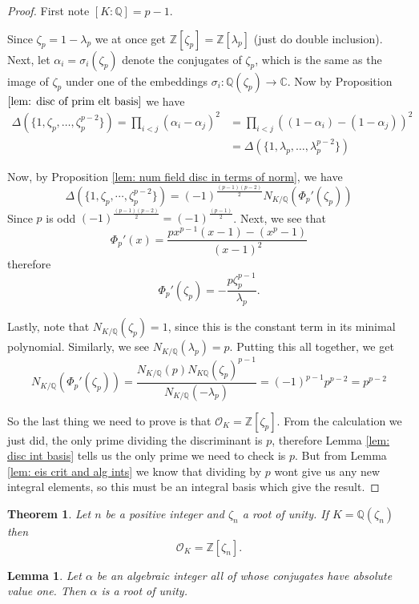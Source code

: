 \documentclass[11pt,a4paper]{amsart}
\theoremstyle{plain}
\newtheorem{thm}[subsection]{Theorem}
\newtheorem{lem}[subsection]{Lemma}
\theoremstyle{definition}
\theoremstyle{definition}
\newcommand{\ZZ}{\mathbb{Z}}
\def\CC{\mathbb{C}}
\def\QQ{\mathbb{Q}}
\def \a{\alpha}
\def \lam {\lambda}
\def \OO {\mathcal{O}}
\begin{document}
	\begin{proof}
		First note $[K:\QQ]=p-1$.
		
		Since $\zeta_p=1-\lam_p$ we at once get $\ZZ[\zeta_p]=\ZZ[\lam_p]$ (just do double inclusion). Next, let $\a_i=\sigma_i(\zeta_p)$ denote the conjugates of $\zeta_p$, which is the same as the image of $\zeta_p$ under one of the embeddings $\sigma_i: \QQ(\zeta_p) \to \CC$. Now  by Proposition $\ref{lem: disc of prim elt basis}$ we have \begin{align*}\Delta(\{1,\zeta_p,\dots,\zeta_p^{p-2}\})=\prod_{i < j}  (\a_i-\a_j)^2 &=\prod_{i < j}  ((1-\a_i)-(1-\a_j))^2\\&=\Delta(\{1,\lam_p,\dots,\lam_p^{p-2}\})\end{align*}
		
		Now, by Proposition \ref{lem: num field disc in terms of norm}, we have \[\Delta(\{1,\zeta_p,\cdots,\zeta_p^{p-2}\})=(-1)^{\frac{(p-1)(p-2)}{2}}N_{K/\QQ}(\Phi_p'(\zeta_p)  )\]
		Since $p$ is odd $(-1)^{\frac{(p-1)(p-2)}{2}}=(-1)^{\frac{(p-1)}{2}}$. Next, we see that \[\Phi_p'(x)=\frac{px^{p-1}(x-1)-(x^p-1)}{(x-1)^2}\] therefore \[\Phi_p'(\zeta_p)=-\frac{p\zeta_p^{p-1}}{\lam_p}.\]
		
		Lastly, note that $N_{K/\QQ}(\zeta_p)=1$, since this is the constant term in its minimal polynomial. Similarly, we see $N_{K/\QQ}(\lam_p)=p$. Putting this all together, we get \[N_{K/\QQ}(\Phi_p'(\zeta_p)  )=\frac{N_{K/\QQ}(p)N_{K\QQ}(\zeta_p)^{p-1}}{N_{K/\QQ}(-\lam_p)}=(-1)^{p-1}p^{p-2}=p^{p-2}\]
		
		So the last thing we need to prove is that $\OO_K=\ZZ[\zeta_p]$. From the calculation we just did, the only prime dividing the discriminant is $p$, therefore Lemma \ref{lem: disc int basis} tells us the only prime we need to check is $p$. But from Lemma \ref{lem: eis crit and alg ints} we know that dividing by $p$ wont give us any new integral elements, so this must be an integral basis which give the result.
		
		
		
	\end{proof}
	
	
	\begin{thm}\label{thm: ring of ints of cyclo field}
		Let $n$ be a positive integer and $\zeta_n$ a root of unity. If $K=\QQ(\zeta_n)$ then \[\OO_K=\ZZ[\zeta_n].\]
	\end{thm}
	
	\begin{lem}\label{lem: alg_int_abs_val_one}
		Let $\a$ be an algebraic integer all of whose conjugates have absolute value one. Then $\a$ is a root of unity.
	\end{lem}
	
\end{document}
